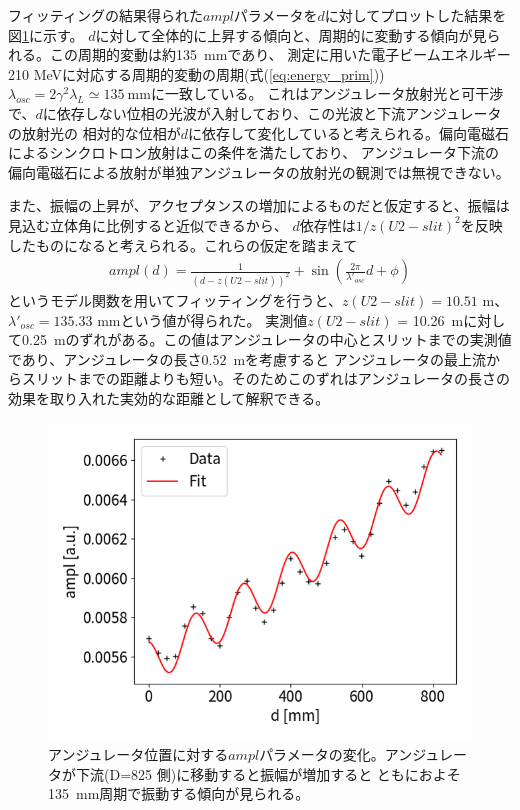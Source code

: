 \documentclass[a4paper,11pt,uplatex]{jsbook}
\begin{document}
フィッティングの結果得られた$ampl$パラメータを$d$に対してプロットした結果を図\ref{DCampl}に示す。
$d$に対して全体的に上昇する傾向と、周期的に変動する傾向が見られる。この周期的変動は約135~mmであり、
測定に用いた電子ビームエネルギー210 MeVに対応する周期的変動の周期(式(\ref{eq:energy_prim}))$\lambda_{osc} = 2\gamma^2\lambda_L \simeq 135~\text{mm}$に一致している。
これはアンジュレータ放射光と可干渉で、$d$に依存しない位相の光波が入射しており、この光波と下流アンジュレータの放射光の
相対的な位相が$d$に依存して変化していると考えられる。偏向電磁石によるシンクロトロン放射はこの条件を満たしており、
アンジュレータ下流の偏向電磁石による放射が単独アンジュレータの放射光の観測では無視できない。

また、振幅の上昇が、アクセプタンスの増加によるものだと仮定すると、振幅は見込む立体角に比例すると近似できるから、
$d$依存性は$1/z(U2-slit)^2$を反映したものになると考えられる。これらの仮定を踏まえて
\begin{eqnarray}
  ampl(d) = \frac{1}{(d - z(U2-slit))^2} + \sin\left( \frac{2\pi}{\lambda'_{osc}}d + \phi \right)\label{eq:ampl}
\end{eqnarray}
というモデル関数を用いてフィッティングを行うと、$z(U2-slit) = 10.51$ m、$\lambda'_{osc}= 135.33$ mmという値が得られた。
実測値$z(U2-slit)$ = 10.26~mに対して0.25~mのずれがある。この値はアンジュレータの中心とスリットまでの実測値であり、アンジュレータの長さ$0.52$~mを考慮すると
アンジュレータの最上流からスリットまでの距離よりも短い。そのためこのずれはアンジュレータの長さの効果を取り入れた実効的な距離として解釈できる。

\begin{figure}[h]
  \centering
  \includegraphics[width=0.8\linewidth]{image/4-DCampl.png}
  \caption[アンジュレータ位置依存性]{アンジュレータ位置に対する$ampl$パラメータの変化。アンジュレータが下流(D=825 側)に移動すると振幅が増加すると
  ともにおよそ135~mm周期で振動する傾向が見られる。}\label{DCampl}
\end{figure}
\end{document}
